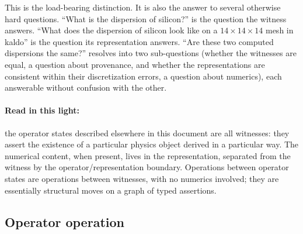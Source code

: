\documentclass[11pt,a4paper]{article}
\begin{document}
This is the load-bearing distinction. It is also the answer to several otherwise hard questions.
``What is the dispersion of silicon?'' is the question the witness answers. ``What does the
dispersion of silicon look like on a $14\times14\times14$ mesh in kaldo'' is the question its
representation answers. ``Are these two computed dispersions the same?'' resolves into two
sub-questions (whether the witnesses are equal, a question about provenance, and whether the
representations are consistent within their discretization errors, a question about numerics), each
answerable without confusion with the other.

\paragraph{Read in this light:}
the operator states described elsewhere in this document are all witnesses: they assert the
existence of a particular physics object derived in a particular way. The numerical content,
when present, lives in the representation, separated from the witness by the operator/representation
boundary. Operations between operator states are operations between witnesses, with no numerics
involved; they are essentially structural moves on a graph of typed assertions.


\subsection{Operator operation}
\end{document}

